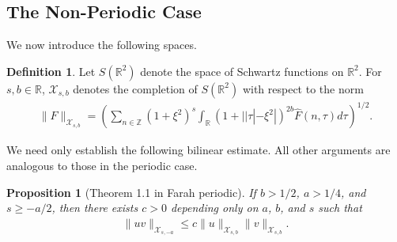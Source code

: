 \documentclass[12pt,reqno]{amsart}
\numberwithin{equation}{section}  %
\numberwithin{figure}{section}
\newcommand{\rr}{\mathbb{R}}
\newcommand{\zz}{\mathbb{Z}}
\newcommand{\wh}{\widehat}
\theoremstyle{plain}
\newtheorem{proposition}{Proposition}
\theoremstyle{definition}
\newtheorem{definition}{Definition}
\theoremstyle{remark}
\begin{document}
\subsection{The Non-Periodic Case} 
\label{ssec:non-periodic-case}
We now introduce the following spaces. 
%
%
\begin{definition}
  Let $S(\rr^{2})$ denote the space of Schwartz functions on
  $\rr^{2}$.  For $s, b \in \rr$, $\mathcal{X}_{s,b}$
  denotes the completion of $S(\rr^{2})$ with
  respect to the norm
  \begin{equation}
  \begin{split}
    \|F\|_{\mathcal{X}_{s,b}} = \left( \sum_{n \in \zz} (1 + \xi^{2})^{s} \int_{\rr}
    (1 + | | \tau | - \xi^{2} |)^{2b} \wh{F}(n, \tau) d \tau\right)^{1/2}.
  \end{split}
  \label{eqn:bous-norm-real}
  \end{equation}
\end{definition}
%
%
We need only establish the following bilinear estimate. All other arguments are
analogous to those in the periodic case.
%
\begin{proposition}[Theorem 1.1 in Farah periodic]
\label{prop:bilin-est-real}
If $b > 1/2$, $a > 1/4$, and $s \ge -a/2$, 
  then there exists $c > 0$ depending only on $a$, $b$, and $s$ such that
  \begin{equation*}
  \begin{split}
    \| uv \|_{\mathcal{X}_{s,-a}} \le c \| u \|_{\mathcal{X}_{s,b}} \| v \|_{\mathcal{X}_{s,b}}.
  \end{split}
  \end{equation*}
\end{proposition}
\end{document}
